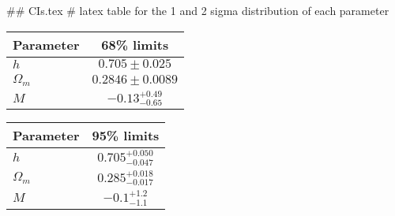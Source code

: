 ## CIs.tex
# latex table for the 1 and 2 sigma distribution of each parameter

\begin{tabular} { l  c}
 Parameter &  68\% limits\\
\hline
{\boldmath$h              $} & $0.705\pm 0.025            $\\
{\boldmath$\Omega_m       $} & $0.2846\pm 0.0089          $\\
{\boldmath$M              $} & $-0.13^{+0.49}_{-0.65}     $\\
\hline
\end{tabular}

\begin{tabular} { l  c}
 Parameter &  95\% limits\\
\hline
{\boldmath$h              $} & $0.705^{+0.050}_{-0.047}   $\\
{\boldmath$\Omega_m       $} & $0.285^{+0.018}_{-0.017}   $\\
{\boldmath$M              $} & $-0.1^{+1.2}_{-1.1}        $\\
\hline
\end{tabular}
